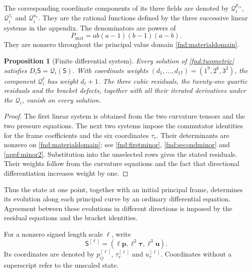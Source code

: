 \documentclass[11pt,a4paper]{article}
\numberwithin{equation}{section}
\theoremstyle{plain}
\newtheorem{proposition}[theorem]{Proposition}
\theoremstyle{definition}
\theoremstyle{remark}
\begin{document}
The corresponding coordinate components of its three fields are denoted
by $\mathcal Q_i^{p_{rs}}$, $\mathcal Q_i^{\tau_r}$ and
$\mathcal Q_i^{u_r}$. They are the rational functions
defined by the three successive linear systems in the appendix. The
denominators are powers of
\begin{equation}\label{fnd:guard}
P_{\mathrm{mat}}=ab(a-1)(b-1)(a-b).
\end{equation}
They are nonzero throughout the principal value domain
\eqref{fnd:materialdomain}.

\begin{proposition}[Finite differential system]\label{fnd:finiteclosure}
Every solution of \eqref{fnd:twometric} satisfies
$D_i\mathsf S=\mathcal Q_i(\mathsf S)$. With coordinate weights
$(d_1,\ldots,d_{17})=(1^9,2^6,3^2)$, the component $\mathcal Q_i^\ell$ has weight $d_\ell+1$.
The three cubic residuals, the twenty-one quartic residuals and the
bracket defects, together with all their iterated derivatives under
the $\mathcal Q_i$, vanish on every solution.
\end{proposition}
\begin{proof}
The first linear system is obtained from the two curvature tensors and
the two pressure equations. The next two systems impose the commutator
identities for the frame coefficients and the six coordinates $\tau_r$.
Their determinants are nonzero on \eqref{fnd:materialdomain}; see
\eqref{fnd:firstminor}, \eqref{fnd:secondminor} and
\eqref{appf:minor2}. Substitution into the unselected rows gives the
stated residuals. Their weights follow from the curvature equations
and the fact that directional differentiation increases weight by one.
\end{proof}

Thus the state at one point, together with an initial principal frame,
determines its evolution along each principal curve by an ordinary
differential equation. Agreement between these evolutions in different
directions is imposed by the residual equations and the bracket identities.

For a nonzero signed length scale $\ell$, write
\begin{equation}\label{fnd:weighted-state}
\mathsf S^{[\ell]}=
(\ell\boldsymbol p,\ell^2\boldsymbol\tau,\ell^3\boldsymbol u).
\end{equation}
Its coordinates are denoted by $p_{ij}^{[\ell]}$, $\tau_r^{[\ell]}$
and $u_r^{[\ell]}$. Coordinates without a superscript refer to the
unscaled state.
\end{document}
